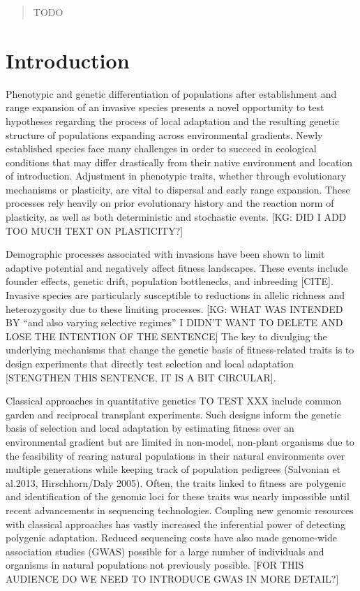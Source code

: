 \documentclass[smallextended]{svjour3}
\begin{document}
\begin{abstract}
TODO

\keywords{}

\end{abstract}


\thispagestyle{empty}

\linenumbers%

\section*{Introduction}


Phenotypic and genetic differentiation of populations after establishment and
range expansion of an invasive species presents a novel opportunity to test
hypotheses regarding the process of local adaptation and the resulting genetic
structure of populations expanding across environmental gradients. Newly
established species face many challenges in order to succeed in
ecological conditions that may differ drastically from their native environment
and location of introduction. Adjustment in phenotypic traits, whether through
evolutionary mechanisms or plasticity, are vital to dispersal and early range
expansion. These processes rely heavily on prior evolutionary history and the
reaction norm of plasticity, as well as both deterministic and stochastic
events. [KG: DID I ADD TOO MUCH TEXT ON PLASTICITY?]

Demographic processes associated with invasions have been shown to limit
adaptive potential and negatively affect fitness landscapes. These events
include founder effects, genetic drift, population bottlenecks, and inbreeding
[CITE].  Invasive species are particularly susceptible to reductions in allelic
richness and heterozygosity due to these limiting processes. [KG: WHAT WAS
INTENDED BY ``and also varying selective regimes'' I DIDN'T WANT TO DELETE AND
LOSE THE INTENTION OF THE SENTENCE]  The key to divulging the underlying
mechanisms that change the genetic basis of fitness-related traits is to design
experiments that directly test selection and local adaptation [STENGTHEN THIS
SENTENCE, IT IS A BIT CIRCULAR].

Classical approaches in quantitative genetics TO TEST XXX include common garden
and reciprocal transplant experiments. Such designs inform the genetic basis of
selection and local adaptation by estimating fitness over an environmental
gradient but are limited in non-model, non-plant organisms due to the
feasibility of rearing natural populations in their natural environments over
multiple generations while keeping track of population pedigrees (Salvonian et
al.2013, Hirschhorn/Daly 2005). Often, the traits linked to fitness are
polygenic and identification of the genomic loci for these traits was nearly
impossible until recent advancements in sequencing technologies. Coupling new
genomic resources with classical approaches has vastly increased the inferential
power of detecting polygenic adaptation. Reduced sequencing costs have also made
genome-wide association studies (GWAS) possible for a large number of
individuals and organisms in natural populations not previously possible. [FOR
THIS AUDIENCE DO WE NEED TO INTRODUCE GWAS IN MORE DETAIL?]
\end{document}
